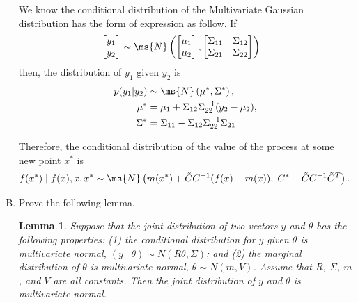 \documentclass[11pt]{article}
\newtheorem{lemma}[theorem]{Lemma}
\begin{document}
\begin{enumerate}[(A)]
We know the conditional distribution of the Multivariate Gaussian distribution has the form of expression as follow. If
\begin{align*}
    \begin{bmatrix}
y_1 \\
y_2 
\end{bmatrix} &\sim \ms{N}\left(  \begin{bmatrix}
\mu_1 \\
\mu_2 
\end{bmatrix},\begin{bmatrix}
\Sigma_{11} & \Sigma_{12} \\
\Sigma_{21} & \Sigma_{22} 
\end{bmatrix}\right)
\end{align*}
then, the distribution of $y_1$ given $y_2$ is 
\begin{align*}
    p(y_1|y_2) &\sim \ms{N}\left(\mu^*, \Sigma^*\right),\\
    \mu^* &= \mu_1 + \Sigma_{12}\Sigma_{22}^{-1}(y_2-\mu_2),\\
    \Sigma^* &= \Sigma_{11}-\Sigma_{12}\Sigma^{-1}_{22}\Sigma_{21}
\end{align*}

Therefore, the conditional distribution of the value of the process at some new point $x^*$ is
\begin{align*}
    f(x^*) \mid f(x), x, x^* &\sim \ms{N}\left(m(x^*) + \tilde{C}C^{-1}(f(x) - m(x)), \; C^* - \tilde{C}C^{-1}\tilde{C}^T\right).
\end{align*}
\bigskip

\item Prove the following lemma.

\begin{lemma}
Suppose that the joint distribution of two vectors $y$ and $\theta$ has the following properties: (1) the conditional distribution for $y$ given $\theta$ is multivariate normal, $(y \mid \theta) \sim N(R\theta, \Sigma)$; and (2) the marginal distribution of $\theta$ is multivariate normal, $\theta \sim N(m,V)$.  Assume that $R$, $\Sigma$, $m$, and $V$ are all constants.  Then the joint distribution of $y$ and $\theta$ is multivariate normal.
\end{lemma}


\end{enumerate}
\end{document}
